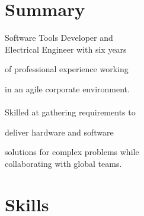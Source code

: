 \documentclass[]{deedy-resume-openfont}
\begin{document}
%
%
\lastupdated

%
%



%
%

\begin{minipage}[t]{0.33\textwidth} 

\section{Summary}

Software Tools Developer and \\ Electrical Engineer
with six years \par of professional experience working \par in an agile corporate environment. \\
\\
Skilled at gathering requirements to \par deliver hardware and
software \par solutions for complex problems while \\
collaborating with global teams.\\
\sectionsep






\section{Skills}

\end{minipage}
\end{document}
